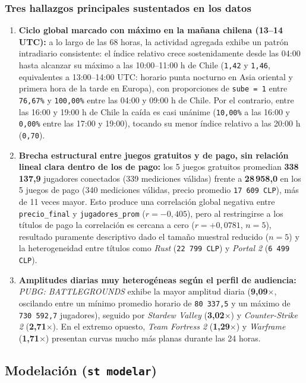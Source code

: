\documentclass[11pt,a4paper]{article}
\begin{document}
\subsubsection{Tres hallazgos principales sustentados en los datos}
\begin{enumerate}
    \item \textbf{Ciclo global marcado con máximo en la mañana chilena (13--14 UTC):} a lo largo de las 68 horas, la actividad agregada exhibe un patrón intradiario consistente: el índice relativo crece sostenidamente desde las 04:00 hasta alcanzar su máximo a las 10:00--11:00 h de Chile (\texttt{1,42} y \texttt{1,46}, equivalentes a 13:00--14:00 UTC: horario punta nocturno en Asia oriental y primera hora de la tarde en Europa), con proporciones de \texttt{sube = 1} entre \texttt{76,67\%} y \texttt{100,00\%} entre las 04:00 y 09:00 h de Chile. Por el contrario, entre las 16:00 y 19:00 h de Chile la caída es casi unánime (\texttt{10,00\%} a las 16:00 y \texttt{0,00\%} entre las 17:00 y 19:00), tocando su menor índice relativo a las 20:00 h (\texttt{0,70}).
    \item \textbf{Brecha estructural entre juegos gratuitos y de pago, sin relación lineal clara dentro de los de pago:} los 5 juegos gratuitos promedian \textbf{338\,137,9} jugadores conectados (339 mediciones válidas) frente a \textbf{28\,958,0} en los 5 juegos de pago (340 mediciones válidas, precio promedio \texttt{17\,609 CLP}), más de 11 veces mayor. Esto produce una correlación global negativa entre \texttt{precio\_final} y \texttt{jugadores\_prom} ($r = -0{,}405$), pero al restringirse a los títulos de pago la correlación es cercana a cero ($r = +0{,}0781$, $n = 5$), resultado puramente descriptivo dado el tamaño muestral reducido ($n = 5$) y la heterogeneidad entre títulos como \emph{Rust} (\texttt{22\,799 CLP}) y \emph{Portal 2} (\texttt{6\,499 CLP}).
    \item \textbf{Amplitudes diarias muy heterogéneas según el perfil de audiencia:} \emph{PUBG: BATTLEGROUNDS} exhibe la mayor amplitud diaria (\textbf{9,09}$\times$, oscilando entre un mínimo promedio horario de \texttt{80\,337,5} y un máximo de \texttt{730\,592,7} jugadores), seguido por \emph{Stardew Valley} (\textbf{3,02}$\times$) y \emph{Counter-Strike 2} (\textbf{2,71}$\times$). En el extremo opuesto, \emph{Team Fortress 2} (\textbf{1,29}$\times$) y \emph{Warframe} (\textbf{1,71}$\times$) presentan curvas mucho más planas durante las 24 horas.
\end{enumerate}

\subsection{Modelación (\texttt{st modelar})}
\end{document}
